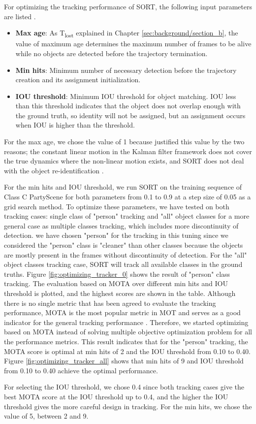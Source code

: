 For optimizing the tracking performance of SORT, the following input parameters are listed \cite{bewley_simple_2016}.
\begin{itemize}
    \item \textbf{Max age}: As T\textsubscript{lost} explained in Chapter \ref{sec:background/section_b}, the value of maximum age determines the maximum number of frames to be alive while no objects are detected before the trajectory termination.
    \item \textbf{Min hits}: Minimum number of necessary detection before the trajectory creation and its assignment initialization.
    \item \textbf{IOU threshold}: Minimum IOU threshold for object matching. IOU less than this threshold indicates that the object does not overlap enough with the ground truth, so identity will not be assigned, but an assignment occurs when IOU is higher than the threshold.
\end{itemize}
For the max age, we chose the value of 1 because \citeauthor{bewley_simple_2016} justified this value by the two reasons; the constant linear motion in the Kalman filter framework does not cover the true dynamics where the non-linear motion exists, and SORT does not deal with the object re-identification \cite{bewley_simple_2016}. 

For the min hits and IOU threshold, we run SORT on the training sequence of Class C PartyScene for both parameters from 0.1 to 0.9 at a step size of 0.05 as a grid search method. To optimize these parameters, we have tested on both tracking cases: single class of "person" tracking and "all" object classes for a more general case as multiple classes tracking, which includes more discontinuity of detection. we have chosen "person" for the tracking in this tuning since we considered the "person" class is "cleaner" than other classes because the objects are mostly present in the frames without discontinuity of detection. For the "all" object classes tracking case, SORT will track all available classes in the ground truths. Figure \ref{fig:optimizing_tracker_0} shows the result of "person" class tracking. The evaluation based on MOTA over different min hits and IOU threshold is plotted, and the highest scores are shown in the table. Although there is no single metric that has been agreed to evaluate the tracking performance, MOTA is the most popular metric in MOT and serves as a good indicator for the general tracking performance \cite{bernardin_evaluating_2008} \cite{milan_mot16_2016}. Therefore, we started optimizing based on MOTA instead of solving multiple objective optimization problem for all the performance metrics. This result indicates that for the "person" tracking, the MOTA score is optimal at min hits of 2 and the IOU threshold from 0.10 to 0.40. Figure \ref{fig:optimizing_tracker_all} shows that min hits of 9 and IOU threshold from 0.10 to 0.40 achieve the optimal performance.

For selecting the IOU threshold, we chose 0.4 since both tracking cases give the best MOTA score at the IOU threshold up to 0.4, and the higher the IOU threshold gives the more careful design in tracking. For the min hits, we chose the value of 5, between 2 and 9. 

